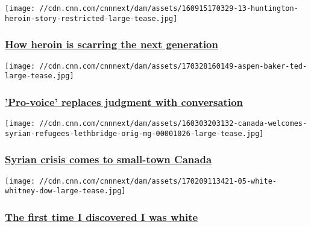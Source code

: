 \href{/2016/09/16/health/huntington-heroin/index.html}{}

\texttt{[image: //cdn.cnn.com/cnnnext/dam/assets/160915170329-13-huntington-heroin-story-restricted-large-tease.jpg]}

\hypertarget{how-heroin-is-scarring-the-next-generation}{%
\subsubsection{\texorpdfstring{\href{/2016/09/16/health/huntington-heroin/index.html}{How
heroin is scarring the next
generation}}{How heroin is scarring the next generation}}\label{how-heroin-is-scarring-the-next-generation}}

\href{/2017/04/14/health/provoice-abortion-stories-eprise/index.html}{}

\texttt{[image: //cdn.cnn.com/cnnnext/dam/assets/170328160149-aspen-baker-ted-large-tease.jpg]}

\hypertarget{pro-voice-replaces-judgment-with-conversation}{%
\subsubsection{\texorpdfstring{\href{/2017/04/14/health/provoice-abortion-stories-eprise/index.html}{'Pro-voice'
replaces judgment with
conversation}}{'Pro-voice' replaces judgment with conversation}}\label{pro-voice-replaces-judgment-with-conversation}}

\href{/2016/03/07/world/canada-welcomes-syrian-refugees/index.html}{}

\texttt{[image: //cdn.cnn.com/cnnnext/dam/assets/160303203132-canada-welcomes-syrian-refugees-lethbridge-orig-mg-00001026-large-tease.jpg]}

\hypertarget{syrian-crisis-comes-to-small-town-canada}{%
\subsubsection{\texorpdfstring{\href{/2016/03/07/world/canada-welcomes-syrian-refugees/index.html}{Syrian
crisis comes to small-town
Canada}}{Syrian crisis comes to small-town Canada}}\label{syrian-crisis-comes-to-small-town-canada}}

\href{/2017/02/10/us/first-time-white/index.html}{}

\texttt{[image: //cdn.cnn.com/cnnnext/dam/assets/170209113421-05-white-whitney-dow-large-tease.jpg]}

\hypertarget{the-first-time-i-discovered-i-was-white}{%
\subsubsection{\texorpdfstring{\href{/2017/02/10/us/first-time-white/index.html}{The
first time I discovered I was
white}}{The first time I discovered I was white}}\label{the-first-time-i-discovered-i-was-white}}

